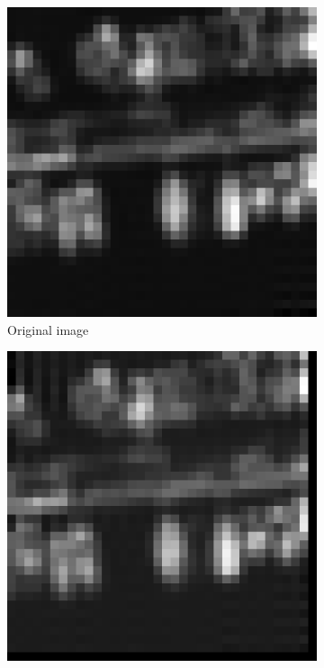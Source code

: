 \begin{figure}[htpb]
  \centering
  \begin{subfigure}[b]{0.24\textwidth}
  \centering
  \includegraphics[width=\textwidth]{img/imOrigBeforeResampling}
  \caption{Original image}
  \end{subfigure}
  \begin{subfigure}[b]{0.24\textwidth}
  \centering
  \includegraphics[width=\textwidth]{img/imAfterResamplingFFT}

\end{subfigure}
\end{figure}
